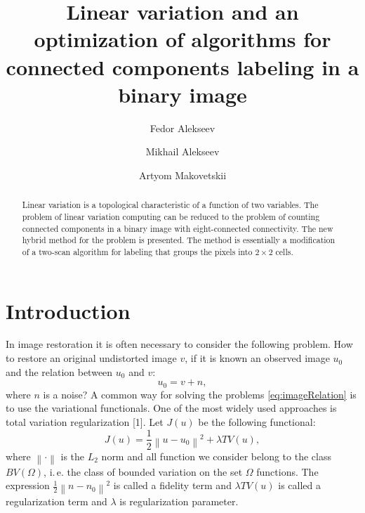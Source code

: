 \documentclass{llncs}
\newcommand{\norm}[1]{\left\lVert#1\right\rVert}
\begin{document}
\title{Linear variation and an optimization of algorithms for connected
components labeling in a binary image}

\author{Fedor Alekseev \and Mikhail Alekseev
\and Artyom Makovetskii}


\maketitle              %

\begin{abstract}
Linear variation is a topological characteristic of a function of two variables.
The problem of linear variation computing can be reduced to the problem
of counting connected components in a binary image with eight-connected connectivity.
The new hybrid method for the problem is presented.
The method is essentially a modification of a two-scan algorithm for labeling
that groups the pixels into $2 \times 2$ cells.

\end{abstract}

\section{Introduction}


In image restoration it is often necessary to consider the following problem.
How to restore an original undistorted image $v$, if it is known an observed
image $u_0$ and the relation between $u_0$ and $v$:
\begin{equation}
  u_0=v+n,
  \label{eq:imageRelation}
\end{equation}
where $n$ is a noise?
A common way for solving the problems \eqref{eq:imageRelation} is to use the
variational functionals.
One of the most widely used approaches is total variation
regularization [1]. %
Let $J(u)$ be the following functional:
\begin{equation}
  J(u) = \frac12 \norm{u - u_0}^2 + \lambda TV(u),
  \label{eq:jFunctional}
\end{equation}
where $\norm{\cdot}$ is the $L_2$ norm and all function we consider belong to the class
$BV(\Omega)$, i.\,e. the class of bounded variation on the set $\Omega$ functions.
%
The expression $\frac12 \norm{n-n_0}^2$ is called a fidelity term and
$\lambda TV(u)$ is called a regularization term and $\lambda$ is regularization
parameter.
\end{document}
